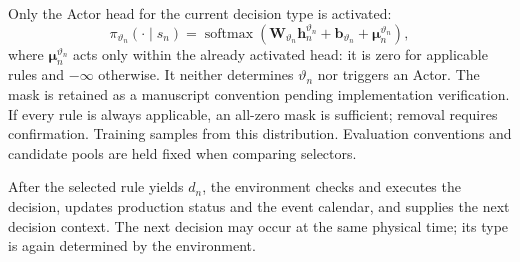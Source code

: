 

Only the Actor head for the current decision type is activated:
\begin{equation}
 \pi_{\vartheta_n}(\cdot\mid s_n)=\operatorname{softmax}\!\left(
 \boldsymbol{W}_{\vartheta_n}\boldsymbol{h}_n^{\vartheta_n}
 +\boldsymbol{b}_{\vartheta_n}+\boldsymbol\mu_n^{\vartheta_n}\right),
 \label{eq:actor_policy}
\end{equation}
where $\boldsymbol\mu_n^{\vartheta_n}$ acts only within the already activated head: it is zero
for applicable rules and $-\infty$ otherwise. It neither determines $\vartheta_n$ nor triggers an Actor.
The mask is retained as a manuscript convention pending implementation verification. If every rule
is always applicable, an all-zero mask is sufficient; removal requires confirmation.
Training samples from this distribution. Evaluation conventions and candidate pools are held fixed
when comparing selectors.


After the selected rule yields $d_n$, the environment checks and executes the decision,
updates production status and the event calendar, and supplies the next decision context.
The next decision may occur at the same physical time; its type is again determined by the environment.

